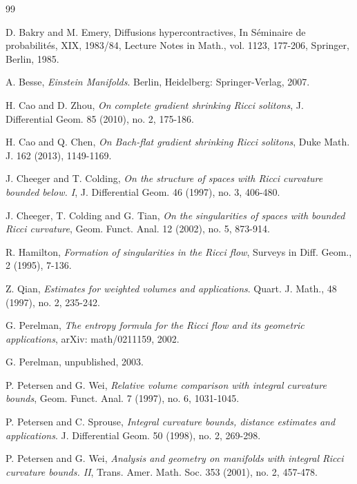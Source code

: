 \documentclass[11pt]{amsart}
\numberwithin{equation}{section}
\begin{document}
\begin{thebibliography}{99}


  D.  Bakry  and  M.  Emery,   Diffusions hypercontractives,  In S\'{e}minaire de probabilit\'{e}s, XIX, 1983/84,  Lecture Notes in Math.,  vol.  1123,  177-206,  Springer, Berlin, 1985.

 A. Besse,  {\it Einstein Manifolds}. Berlin, Heidelberg: Springer-Verlag, 2007.

 H. Cao and D. Zhou, {\it  On  complete  gradient shrinking Ricci solitons}, J. Differential Geom.  85  (2010), no. 2, 175-186.

  H. Cao  and  Q. Chen,
\textit{On Bach-flat gradient shrinking Ricci solitons},
Duke Math. J. 162 (2013), 1149-1169.


 J. Cheeger and T. Colding, {\it On the structure of spaces with Ricci curvature bounded below. I}, J. Differential Geom.  46  (1997),  no. 3, 406-480.


 J. Cheeger,  T. Colding and G.  Tian,  {\it On the singularities of spaces with bounded Ricci curvature},
Geom. Funct. Anal. 12 (2002), no. 5, 873-914.

 R. Hamilton,
\textit{ Formation of singularities in the Ricci flow},  Surveys in Diff. Geom., 2 (1995), 7-136.

 Z. Qian,  {\it   Estimates for weighted volumes and applications}.  Quart. J. Math., 48 (1997), no. 2, 235-242.

 G. Perelman, {\it The entropy formula for the Ricci flow and its
geometric applications},  arXiv: math/0211159, 2002.

 G. Perelman,  unpublished, 2003.

 P. Petersen and  G. Wei, {\it Relative volume comparison with integral curvature bounds}, Geom. Funct. Anal. 7 (1997), no. 6, 1031-1045.

 P. Petersen and C. Sprouse, {\it Integral curvature bounds,  distance estimates and applications}. J. Differential Geom. 50 (1998), no. 2, 269-298.

 P. Petersen and  G. Wei, {\it  Analysis and geometry on manifolds  with integral Ricci curvature bounds. II}, Trans. Amer. Math. Soc. 353 (2001), no. 2, 457-478.


\end{thebibliography}
\end{document}
